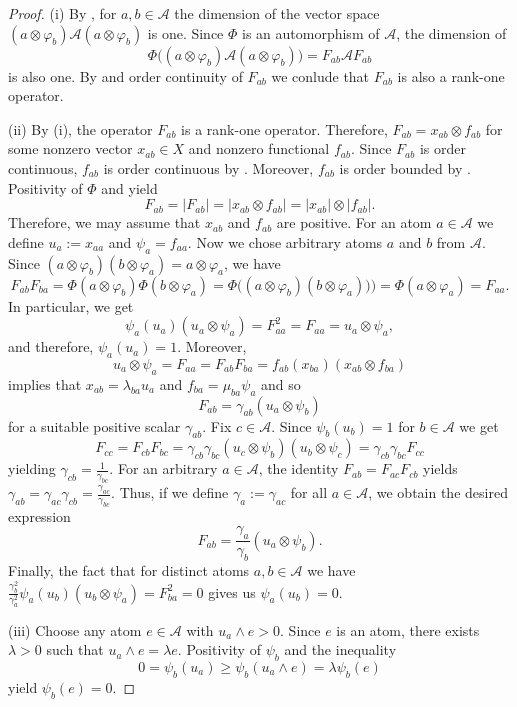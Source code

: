 \documentclass[12pt,reqno]{amsart}
\theoremstyle{plain}
\theoremstyle{definition}
\begin{document}
\begin{proof}
(i) By , for $a,b\in \mathcal A$ the dimension of the vector space $(a\otimes \varphi_b)\mathscr A(a\otimes \varphi_b)$ is one. Since $\Phi$ is an automorphism of $\mathscr A$, the dimension of
$$\Phi\big((a\otimes \varphi_b)\mathscr A(a\otimes \varphi_b)\big)=F_{ab}\mathscr AF_{ab}$$
is also one. By  and order continuity of $F_{ab}$ we conlude that $F_{ab}$ is also a rank-one operator.

(ii) By (i), the operator $F_{ab}$ is a rank-one operator. Therefore, $F_{ab}=x_{ab}\otimes f_{ab}$ for some nonzero vector $x_{ab}\in X$ and nonzero functional $f_{ab}$. Since $F_{ab}$ is order continuous, $f_{ab}$ is order continuous by  . 
Moreover, $f_{ab}$ is order bounded by \cite[Theorem 2.1]{AS05}. Positivity of $\Phi$ and \cite[Theorem 1.72]{Aliprantis:06} yield
$$F_{ab}=|F_{ab}|=|x_{ab}\otimes f_{ab}|=|x_{ab}|\otimes |f_{ab}|.$$ Therefore, we may assume that $x_{ab}$ and $f_{ab}$ are positive.
For an atom $a\in \mathcal A$ we define $u_a:=x_{aa}$ and $\psi_a=f_{aa}$.
Now we chose arbitrary atoms $a$ and $b$ from $\mathcal A$.
Since $(a\otimes \varphi_b)(b\otimes \varphi_a)=a\otimes \varphi_a$, we have
$$F_{ab}F_{ba}=\Phi(a\otimes \varphi_b)\Phi(b\otimes \varphi_a)=\Phi\big((a\otimes \varphi_b)(b\otimes \varphi_a)\big))=\Phi(a\otimes \varphi_a)=F_{aa}.$$
In particular, we get $$\psi_a(u_a)(u_a\otimes \psi_a)=F_{aa}^2=F_{aa}=u_a\otimes \psi_a,$$ and therefore, $\psi_a(u_a)=1$. Moreover, $$u_a\otimes\psi_a=F_{aa}=F_{ab}F_{ba}=f_{ab}(x_{ba})(x_{ab}\otimes f_{ba})$$ implies that $x_{ab}=\lambda_{ba}u_a$ and $f_{ba}=\mu_{ba}\psi_a$ and so $$F_{ab}=\gamma_{ab}(u_a\otimes\psi_b)$$ for a suitable positive scalar $\gamma_{ab}$. Fix $c\in\mathcal A$. Since $\psi_b(u_b)=1$ for $b\in\mathcal A$ we get $$F_{cc}=F_{cb}F_{bc}=\gamma_{cb}\gamma_{bc}(u_c\otimes\psi_b)(u_b\otimes\psi_c)=\gamma_{cb}\gamma_{bc}F_{cc}$$ yielding $\gamma_{cb}=\frac{1}{\gamma_{bc}}$. 
For an arbitrary $a \in \mathcal{A}$, the identity $F_{ab} = F_{ac} F_{cb}$ yields $\gamma_{ab} = \gamma_{ac} \gamma_{cb} = \frac{\gamma_{ac}}{\gamma_{bc}}$. Thus, if we define $\gamma_a:=\gamma_{ac}$ for all $a \in \mathcal{A}$, we obtain the desired expression
$$
F_{ab} = \frac{\gamma_a}{\gamma_b} (u_a \otimes \psi_b).
$$
Finally, the fact that for distinct atoms $a,b\in\mathcal A$ we have $\frac{\gamma_{b}^2}{\gamma_{a}^2}\psi_a(u_b)(u_b\otimes\psi_a)=F_{ba}^2=0$ gives us $\psi_a(u_b)=0$. 

(iii)  Choose any atom $e\in \mathcal A$ with $u_a\wedge e>0$. Since $e$ is an atom, there exists $\lambda>0$ such that $u_a\wedge e=\lambda e$.
Positivity of $\psi_b$ and the inequality
$$0=\psi_b(u_a)\geq \psi_b(u_a\wedge e)=\lambda \psi_b(e)$$ yield $\psi_b(e)=0$.
\end{proof}
\end{document}
